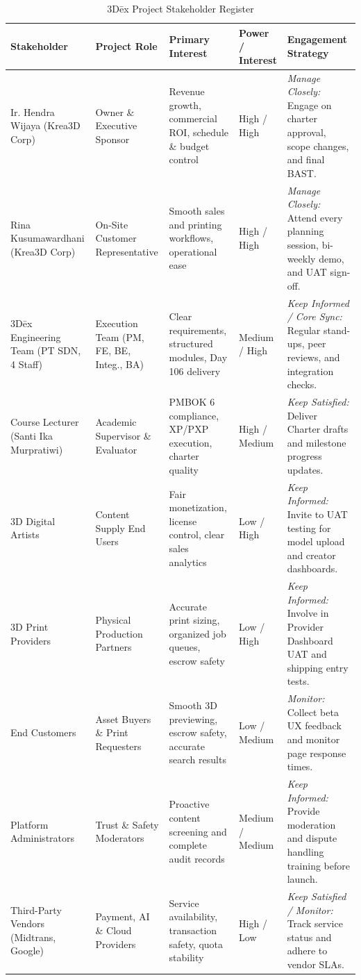 \documentclass[11pt,a4paper]{article}
\newcommand{\thdr}[1]{\centering\arraybackslash\textbf{#1}}
\begin{document}
\begin{table}[H]
\centering
\caption{3D\={e}x Project Stakeholder Register}
\footnotesize
\begin{tabularx}{\textwidth}{| L{2.7cm} | L{2.7cm} | L{3.6cm} | C{1.9cm} | Y |}
\hline
{} \thdr{Stakeholder} & \thdr{Project Role} & \thdr{Primary Interest} & \thdr{Power / Interest} & \thdr{Engagement Strategy} \\
\hline
Ir. Hendra Wijaya (Krea3D Corp) & Owner \& Executive Sponsor & Revenue growth, commercial ROI, schedule \& budget control & High / High & \textit{Manage Closely:} Engage on charter approval, scope changes, and final BAST. \\
\hline
Rina Kusumawardhani (Krea3D Corp) & On-Site Customer Representative & Smooth sales and printing workflows, operational ease & High / High & \textit{Manage Closely:} Attend every planning session, bi-weekly demo, and UAT sign-off. \\
\hline
3D\={e}x Engineering Team (PT SDN, 4 Staff) & Execution Team (PM, FE, BE, Integ., BA) & Clear requirements, structured modules, Day 106 delivery & Medium / High & \textit{Keep Informed / Core Sync:} Regular stand-ups, peer reviews, and integration checks. \\
\hline
Course Lecturer (Santi Ika Murpratiwi) & Academic Supervisor \& Evaluator & PMBOK 6 compliance, XP/PXP execution, charter quality & High / Medium & \textit{Keep Satisfied:} Deliver Charter drafts and milestone progress updates. \\
\hline
3D Digital Artists & Content Supply End Users & Fair monetization, license control, clear sales analytics & Low / High & \textit{Keep Informed:} Invite to UAT testing for model upload and creator dashboards. \\
\hline
3D Print Providers & Physical Production Partners & Accurate print sizing, organized job queues, escrow safety & Low / High & \textit{Keep Informed:} Involve in Provider Dashboard UAT and shipping entry tests. \\
\hline
End Customers & Asset Buyers \& Print Requesters & Smooth 3D previewing, escrow safety, accurate search results & Low / Medium & \textit{Monitor:} Collect beta UX feedback and monitor page response times. \\
\hline
Platform Administrators & Trust \& Safety Moderators & Proactive content screening and complete audit records & Medium / Medium & \textit{Keep Informed:} Provide moderation and dispute handling training before launch. \\
\hline
Third-Party Vendors (Midtrans, Google) & Payment, AI \& Cloud Providers & Service availability, transaction safety, quota stability & High / Low & \textit{Keep Satisfied / Monitor:} Track service status and adhere to vendor SLAs. \\
\hline
\end{tabularx}
\end{table}
\end{document}
